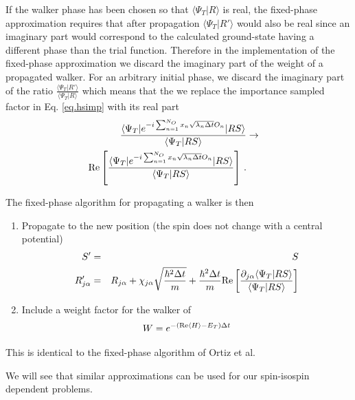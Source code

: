  If the walker phase has been chosen so that $\langle \Psi_T|R\rangle$
 is real, the fixed-phase approximation requires that after propagation
 $\langle \Psi_T|R'\rangle$ would also be real since an imaginary
 part would correspond to the calculated ground-state having a different
 phase than the trial function. Therefore in the implementation of the
 fixed-phase approximation
 we discard the imaginary part of the weight of a propagated walker.
 For an arbitrary initial phase, we discard the imaginary part of the
 ratio $\frac{\langle \Psi_T|R'\rangle}{\langle \Psi_T|R\rangle}$ which
 means that the we replace the importance sampled factor in
 Eq. \ref{eq.hsimp} with its real part
 \begin{eqnarray}
 \frac{\langle \Psi_T |
 	e^{-i\sum_{n=1}^{N_O} x_n \sqrt{\lambda_n \Delta t} O_n}|R S\rangle}
 {\langle \Psi_T|RS\rangle}
 &\rightarrow&
 \nonumber\\
 {\rm Re} \left [ \frac{\langle \Psi_T |
 	e^{-i\sum_{n=1}^{N_O} x_n \sqrt{\lambda_n \Delta t} O_n}|R S\rangle}
 {\langle \Psi_T|RS\rangle} \right ] \,.
 \end{eqnarray}
 
 The fixed-phase algorithm for propagating a walker is then
 \begin{enumerate}
 	\item
 	Propagate to the new position (the spin does not change with a central
 	potential)
 	\begin{eqnarray}
 	S' &=& S
 	\nonumber\\
 	R'_{j\alpha} &=&
 	R_{j\alpha}+ \chi_{j\alpha} \sqrt{\frac{\hbar^2 \Delta t}{m}}
 	+
 	\frac{\hbar^2 \Delta t}{m}
 	{\rm Re} \left [ \frac{\partial_{j\alpha} \langle \Psi_T |RS\rangle}
 	{\langle \Psi_T |RS\rangle} \right ]
 	\nonumber\\
 	\end{eqnarray}
 	\item
 	Include a weight factor for the walker of
 	\begin{equation}
 	W = e^{ -({\rm Re} \langle H\rangle -E_T)\Delta t}
 	\end{equation}
 \end{enumerate}
 This is identical to the fixed-phase algorithm of Ortiz et al.
 
 We will see that similar approximations can be used for our spin-isospin
 dependent problems.
 
